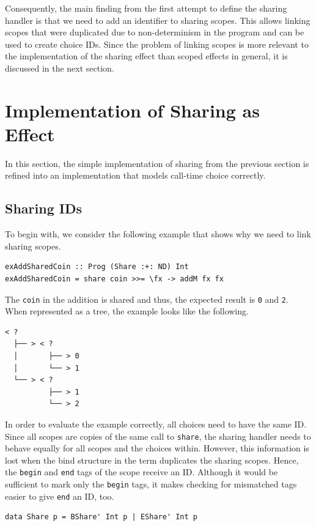 \documentclass[a4paper, 11pt, fleqn, twoside]{scrreprt}
\newcommand{\hinl}[1]{\texttt{#1}}
\begin{document}
Consequently, the main finding from the first attempt to define the sharing handler is that we need to add an identifier to sharing scopes.
This allows linking scopes that were duplicated due to non-determinism in the program and can be used to create choice IDs.
Since the problem of linking scopes is more relevant to the implementation of the sharing effect than scoped effects in general, it is discussed in the next section.

\section{Implementation of Sharing as Effect}
\label{subsec:sharingImplementation}
In this section, the simple implementation of sharing from the previous section is refined into an implementation that models call-time choice correctly.

\subsection{Sharing IDs}
To begin with, we consider the following example that shows why we need to link sharing scopes.

\begin{verbatim}
exAddSharedCoin :: Prog (Share :+: ND) Int
exAddSharedCoin = share coin >>= \fx -> addM fx fx
\end{verbatim}

The \hinl{coin} in the addition is shared and thus, the expected result is \hinl{0} and \hinl{2}.
When represented as a tree, the example looks like the following.

\begin{verbatim}
< ? 
  ├── > < ? 
  │       ├── > 0
  │       └── > 1
  └── > < ? 
          ├── > 1
          └── > 2
\end{verbatim}

In order to evaluate the example correctly, all choices need to have the same ID.
Since all scopes are copies of the same call to \hinl{share}, the sharing handler needs to behave equally for all scopes and the choices within.
However, this information is lost when the bind structure in the term duplicates the sharing scopes.
Hence, the \hinl{begin} and \hinl{end} tags of the scope receive an ID.
Although it would be sufficient to mark only the \hinl{begin} tags, it makes checking for mismatched tags easier to give \hinl{end} an ID, too.

\begin{verbatim}
data Share p = BShare' Int p | EShare' Int p
\end{verbatim}
\end{document}
